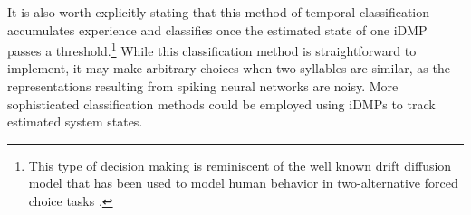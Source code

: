It is also worth explicitly stating
that this method of temporal classification
accumulates experience and classifies
once the estimated state of one iDMP
passes a threshold.\footnote{
  This type of decision making is reminiscent
  of the well known drift diffusion model
  that has been used to model
  human behavior in two-alternative forced choice tasks
  \citep{bogacz2006}.}
While this classification method
is straightforward to implement,
it may make arbitrary choices
when two syllables are similar,
as the representations resulting
from spiking neural networks are noisy.
More sophisticated classification methods
could be employed using
iDMPs to track estimated system states.
